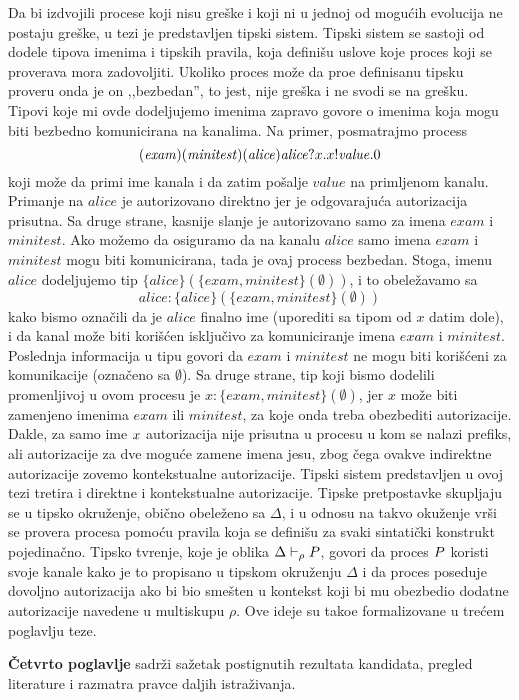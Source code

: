 Da bi izdvojili procese koji nisu gre\v ske i koji ni u jednoj od mogu\' cih evolucija ne postaju gre\v ske, u tezi je predstavljen tipski sistem. Tipski sistem se sastoji od dodele tipova imenima i tipskih pravila, koja defini\v su uslove koje proces koji se proverava mora zadovoljiti. Ukoliko proces mo\v ze da pro\dj e definisanu tipsku proveru onda je on ,,bezbedan'', to jest, nije gre\v ska i ne svodi se na gre\v sku. Tipovi koje mi ovde dodeljujemo imenima zapravo govore o imenima koja mogu biti bezbedno komunicirana na kanalima. 
Na primer, posmatrajmo process
$$
(\mathit{exam})(\mathit{minitest})
(\mathit{alice})\mathit{alice}?x.
x!\mathit{value}. 0
$$
koji mo\v ze da primi ime kanala i da zatim po\v salje  $\mathit{value}$ na primljenom kanalu. Primanje na $\mathit{alice}$ je autorizovano direktno jer je odgovaraju\' ca autorizacija prisutna. Sa druge strane, kasnije slanje je autorizovano samo za imena  $\mathit{exam}$ i $\mathit{minitest}$. Ako mo\v zemo da osiguramo da na kanalu $\mathit{alice}$ samo imena $\mathit{exam}$ i $\mathit{minitest}$ mogu biti komunicirana, tada je ovaj process bezbedan.
Stoga, imenu  $\mathit{alice}$ dodeljujemo tip 
 $ \{\mathit{alice}\}( \{\mathit{exam},\mathit{minitest}\} ( \emptyset ))$, i to obele\v zavamo sa 
 $$\mathit{alice}:\{\mathit{alice}\}( \{\mathit{exam},\mathit{minitest}\} ( \emptyset ))$$ 
 kako bismo ozna\v cili  da je $\mathit{alice}$ finalno ime (uporediti sa tipom od $x$ datim dole), i da 
kanal mo\v ze biti kori\v s\' cen isklju\v civo za komuniciranje imena $\mathit{exam}$ i $\mathit{minitest}$.  Poslednja informacija u tipu govori da $\mathit{exam}$  i $\mathit{minitest}$
ne mogu biti kori\v s\' ceni za komunikacije (ozna\v ceno sa $\emptyset$). 
Sa druge strane, tip koji bismo dodelili promenljivoj u ovom procesu je $x:\{\mathit{exam},\mathit{minitest}\} ( \emptyset )$, jer $x$ mo\v ze biti zamenjeno imenima $\mathit{exam}$ ili $\mathit{minitest}$, za koje onda treba obezbediti autorizacije. Dakle, za samo ime $x$ autorizacija nije prisutna u procesu u kom se nalazi prefiks, ali autorizacije za dve mogu\' ce zamene imena jesu, zbog \v cega ovakve indirektne autorizacije zovemo kontekstualne autorizacije. Tipski sistem predstavljen u ovoj tezi tretira i direktne i kontekstualne autorizacije. Tipske pretpostavke skupljaju se u tipsko okru\v zenje, obi\v cno obele\v zeno sa $\Delta$, i u odnosu na takvo oku\v zenje vr\v si se provera procesa pomo\' cu pravila koja se defini\v su za svaki sintati\v cki konstrukt pojedina\v cno. Tipsko tvr\dj enje, koje je oblika $\Delta\vdash_\rho P$, govori da proces $P$ koristi svoje kanale kako je to propisano u tipskom okru\v zenju $\Delta$ i da proces poseduje dovoljno autorizacija ako bi bio sme\v sten u kontekst koji bi mu obezbedio dodatne autorizacije navedene u multiskupu $\rho$. Ove ideje su tako\dj e formalizovane u tre\' cem poglavlju teze. 


{\bf \v Cetvrto poglavlje} sadr\v zi sa\v zetak postignutih rezultata kandidata, pregled literature i razmatra pravce daljih istra\v zivanja.

